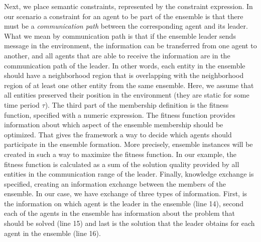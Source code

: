 \documentclass[journal]{IEEEtran}
\theoremstyle{definition}
\begin{document}

 
Next, we place semantic constraints, represented by the constraint expression. In our scenario a constraint for an agent to be part of the ensemble is that there must be a \textit{communication path} between the corresponding agent and its leader. What we mean by communication path is that if the ensemble leader sends message in the environment, the information can be transferred from one agent to another, and all agents that are able to receive the information are in the communication path of the leader.
In other words, each entity in the ensemble should have a neighborhood region that is overlapping with the neighborhood region 
of at least one other entity from the same ensemble.
Here, we assume that all entities preserved their position in the environment (they are static for some time period $\tau$). 
The third part of the membership definition is the fitness function, specified with a numeric expression. The fitness function provides information about which aspect of the ensemble membership should be optimized. That gives the framework a way to decide which agents should participate in the ensemble formation. More precisely, ensemble instances will be created in such a way to maximize the fitness function. In our example, the fitness function is calculated as a sum of the solution quality provided by all entities in the communication range of the leader. Finally, knowledge exchange is specified, creating an information exchange between the members of the ensemble. In our case, we have exchange of three types of information. First, is the information on which agent is the leader in the ensemble (line 14), second each of the agents in the ensemble has information about the problem that should be solved (line 15) and last is the solution that the leader obtains 
for each agent in the ensemble (line 16). 
\end{document}
